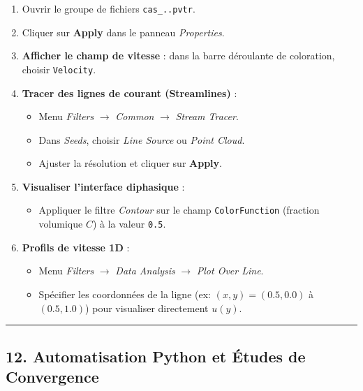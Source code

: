 \documentclass[
  french,
]{article}
\providecommand{\tightlist}{%
  \setlength{\itemsep}{0pt}\setlength{\parskip}{0pt}}
\begin{document}
\begin{enumerate}
\def\labelenumi{\arabic{enumi}.}
\tightlist
\item
  Ouvrir le groupe de fichiers \texttt{cas\_..pvtr}.
\item
  Cliquer sur \textbf{Apply} dans le panneau \emph{Properties}.
\item
  \textbf{Afficher le champ de vitesse} : dans la barre déroulante de
  coloration, choisir \texttt{Velocity}.
\item
  \textbf{Tracer des lignes de courant (Streamlines)} :

  \begin{itemize}
  \tightlist
  \item
    Menu \emph{Filters} \(\to\) \emph{Common} \(\to\) \emph{Stream
    Tracer}.
  \item
    Dans \emph{Seeds}, choisir \emph{Line Source} ou \emph{Point Cloud}.
  \item
    Ajuster la résolution et cliquer sur \textbf{Apply}.
  \end{itemize}
\item
  \textbf{Visualiser l'interface diphasique} :

  \begin{itemize}
  \tightlist
  \item
    Appliquer le filtre \emph{Contour} sur le champ
    \texttt{ColorFunction} (fraction volumique \(C\)) à la valeur
    \texttt{0.5}.
  \end{itemize}
\item
  \textbf{Profils de vitesse 1D} :

  \begin{itemize}
  \tightlist
  \item
    Menu \emph{Filters} \(\to\) \emph{Data Analysis} \(\to\) \emph{Plot
    Over Line}.
  \item
    Spécifier les coordonnées de la ligne (ex: \((x, y) = (0.5, 0.0)\) à
    \((0.5, 1.0)\)) pour visualiser directement \(u(y)\).
  \end{itemize}
\end{enumerate}

\begin{center}\rule{0.5\linewidth}{0.5pt}\end{center}

\subsection{12. Automatisation Python et Études de
Convergence}\label{automatisation-python-et-uxe9tudes-de-convergence}
\end{document}

